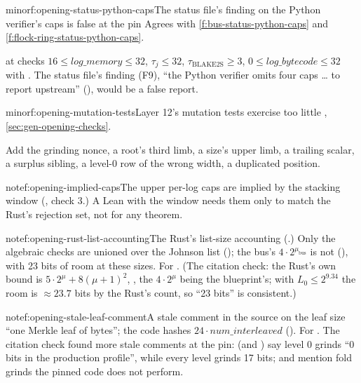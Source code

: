 \begin{finding}{minor}{f:opening-status-python-caps}{The status file's finding on the Python verifier's caps is false at the pin}
Agrees with \cref{f:bus-status-python-caps} and \cref{f:flock-ring-status-python-caps}.

  at  checks $16 ≤ \mathit{log\_memory} ≤ 32$,
$τ_j ≤ 32$, $τ_{\mathrm{BLAKE2S}} ≥ 3$, $0 ≤ \mathit{log\_bytecode} ≤ 32$ with . The
status file's finding (F9), ``the Python verifier omits four caps … to report upstream''
(), would be a false report.
\end{finding}

\begin{finding}{minor}{f:opening-mutation-tests}{Layer 12's mutation tests exercise too little}
 , \cref{sec:gen-opening-checks}.

 Add the grinding nonce, a root's third limb, a size's upper limb, a trailing
scalar, a surplus sibling, a level-0 row of the wrong width, a duplicated position.
\end{finding}

\begin{finding}{note}{f:opening-implied-caps}{The upper per-log caps are implied by the stacking window}
(, check 3.) A Lean  with the window needs them
only to match the Rust's rejection set, not for any theorem.
\end{finding}

\begin{finding}{note}{f:opening-rust-list-accounting}{The Rust's list-size accounting}
(.) Only the algebraic checks are unioned over the Johnson list
(); the bus's $4·2^{μ_{\mathrm{bus}}}$ is not (),
with 23 bits of room at these sizes. For . (The citation check: the
Rust's own bound is $5·2^μ + 8(μ+1)^2$, , the $4·2^μ$ being the blueprint's; with
$L_0 ≤ 2^{9.34}$ the room is $≈ 23.7$ bits by the Rust's count, so ``23 bits'' is consistent.)
\end{finding}

\begin{finding}{note}{f:opening-stale-leaf-comment}{A stale comment in the source on the leaf size}
 ``one Merkle leaf of  bytes''; the code hashes
$24·\mathit{num\_interleaved}$ (). For . The citation check
found more stale comments at the pin:  (and ) say level 0
grinds ``0 bits in the production profile'', while every level grinds 17 bits; 
and  mention fold grinds the pinned code does not perform.
\end{finding}

